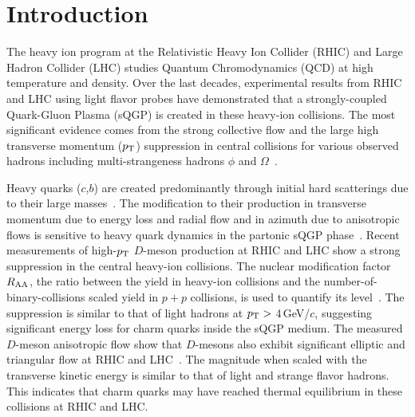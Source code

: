 \documentclass[%
 reprint,	
 amsmath,amssymb,
 aps,
 prc,
]{revtex4-1}
\begin{document}
\maketitle
%
%
%

\section{\label{sec:introduction}Introduction}
The heavy ion program at the Relativistic Heavy Ion Collider (RHIC) and Large Hadron Collider (LHC) studies Quantum Chromodynamics (QCD) at high temperature and density. Over the last decades, experimental results from RHIC and LHC using light flavor probes have demonstrated that a strongly-coupled Quark-Gluon Plasma (sQGP) is created in these heavy-ion collisions. The most significant evidence comes from the strong collective flow and the large high transverse momentum ($p_{\rm T}$) suppression in central collisions for various observed hadrons including multi-strangeness hadrons $\phi$ and $\Omega$~\cite{StarWhitePaper,PhenixWhitePaper,LhcSummary,Adamczyk:2015ukd,Abelev:2014pua}.

Heavy quarks ($c$,$b$) are created predominantly through initial hard scatterings due to their large masses~\cite{Ziwei_Lin,Cacciari}. The modification to their production in transverse momentum due to energy loss and radial flow and in azimuth due to anisotropic flows is sensitive to heavy quark dynamics in the partonic sQGP phase~\cite{Moore}. Recent measurements of high-$p_{\rm T}$ $D$-meson production at RHIC and LHC show a strong suppression in the central heavy-ion collisions. The nuclear modification factor $R_{\rm AA}$, the ratio between the yield in heavy-ion collisions and the number-of-binary-collisions scaled yield in $p+p$ collisions, is used to quantify its level~\cite{Alice_D_RAA_1,Alice_D_RAA_2,CMS_D_RAA_5TeV,Star_D_RAA}. The suppression is similar to that of light hadrons at $p_{\rm T}>$ 4\,GeV/$c$, suggesting significant energy loss for charm quarks inside the sQGP medium. The measured $D$-meson anisotropic flow show that $D$-mesons also exhibit significant elliptic and triangular flow at RHIC and LHC~\cite{Alice_D_v2_276TeV_PRL,Alice_D_v2_276TeV_PRC,CMS_D_vn_5TeV,Star_D_v2}. The magnitude when scaled with the transverse kinetic energy is similar to that of light and strange flavor hadrons. This indicates that charm quarks may have reached thermal equilibrium in these collisions at RHIC and LHC.
\end{document}
